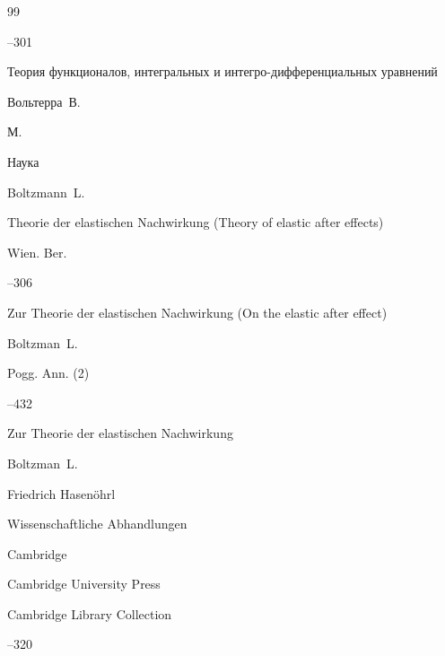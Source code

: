 \documentclass[11pt,a4paper,twoside]{article}
\begin{document}
\begin{thebibliography}{99}


–301







\book Теория функционалов, интегральных и интегро-дифференциальных уравнений


\by Вольтерра~В.


\publaddr М.


\publ Наука











\by Boltzmann~L.


\paper Theorie der elastischen Nachwirkung (Theory of elastic after effects)




\jour Wien. Ber.






–306\!\!


\moreref


\paper 	Zur Theorie der elastischen Nachwirkung (On the elastic after effect)


\by    Boltzman~L.




\jour Pogg. Ann. \rm (2)




--432\!\! 




\moreref


\paper 	Zur Theorie der elastischen Nachwirkung 


\by    Boltzman~L.


\ed  Friedrich Hasen\"ohrl


\inbook Wissenschaftliche Abhandlungen




\publaddr Cambridge


\publ Cambridge University Press




\serial Cambridge Library Collection


--320








\end{thebibliography}
\end{document}
